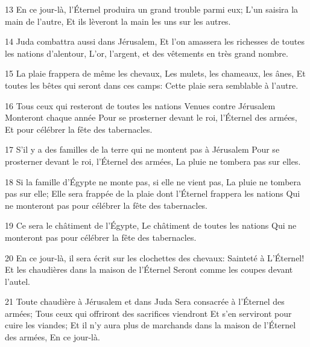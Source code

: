 \par 13 En ce jour-là, l'Éternel produira un grand trouble parmi eux; L'un saisira la main de l'autre, Et ils lèveront la main les uns sur les autres.
\par 14 Juda combattra aussi dans Jérusalem, Et l'on amassera les richesses de toutes les nations d'alentour, L'or, l'argent, et des vêtements en très grand nombre.
\par 15 La plaie frappera de même les chevaux, Les mulets, les chameaux, les ânes, Et toutes les bêtes qui seront dans ces camps: Cette plaie sera semblable à l'autre.
\par 16 Tous ceux qui resteront de toutes les nations Venues contre Jérusalem Monteront chaque année Pour se prosterner devant le roi, l'Éternel des armées, Et pour célébrer la fête des tabernacles.
\par 17 S'il y a des familles de la terre qui ne montent pas à Jérusalem Pour se prosterner devant le roi, l'Éternel des armées, La pluie ne tombera pas sur elles.
\par 18 Si la famille d'Égypte ne monte pas, si elle ne vient pas, La pluie ne tombera pas sur elle; Elle sera frappée de la plaie dont l'Éternel frappera les nations Qui ne monteront pas pour célébrer la fête des tabernacles.
\par 19 Ce sera le châtiment de l'Égypte, Le châtiment de toutes les nations Qui ne monteront pas pour célébrer la fête des tabernacles.
\par 20 En ce jour-là, il sera écrit sur les clochettes des chevaux: Sainteté à L'Éternel! Et les chaudières dans la maison de l'Éternel Seront comme les coupes devant l'autel.
\par 21 Toute chaudière à Jérusalem et dans Juda Sera consacrée à l'Éternel des armées; Tous ceux qui offriront des sacrifices viendront Et s'en serviront pour cuire les viandes; Et il n'y aura plus de marchands dans la maison de l'Éternel des armées, En ce jour-là.


